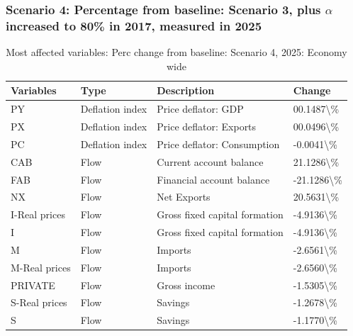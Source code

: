 \documentclass[
]{book}
\begin{document}
\hypertarget{scenario-4-percentage-from-baseline-scenario-3-plus-alpha-increased-to-80-in-2017-measured-in-2025}{%
\subsubsection{\texorpdfstring{Scenario 4: Percentage from baseline: Scenario 3, plus \(\alpha\) increased to 80\% in 2017, measured in 2025}{Scenario 4: Percentage from baseline: Scenario 3, plus \textbackslash alpha increased to 80\% in 2017, measured in 2025}}\label{scenario-4-percentage-from-baseline-scenario-3-plus-alpha-increased-to-80-in-2017-measured-in-2025}}

\begin{table}

\caption{\label{tab:most-affected-Scenario-4-2025-perc-economy}Most affected variables: Perc change from baseline: Scenario 4, 2025: Economy wide}
\centering
\fontsize{10}{12}\selectfont
\begin{tabular}[t]{l|l|l|l}
\hline
Variables & Type & Description & Change\\
\hline
PY & Deflation index & Price deflator: GDP & 00.1487\textbackslash{}\%\\
\hline
PX & Deflation index & Price deflator: Exports & 00.0496\textbackslash{}\%\\
\hline
PC & Deflation index & Price deflator: Consumption & -0.0041\textbackslash{}\%\\
\hline
CAB & Flow & Current account balance & 21.1286\textbackslash{}\%\\
\hline
FAB & Flow & Financial account balance & -21.1286\textbackslash{}\%\\
\hline
NX & Flow & Net Exports & 20.5631\textbackslash{}\%\\
\hline
I-Real prices & Flow & Gross fixed capital formation & -4.9136\textbackslash{}\%\\
\hline
I & Flow & Gross fixed capital formation & -4.9136\textbackslash{}\%\\
\hline
M & Flow & Imports & -2.6561\textbackslash{}\%\\
\hline
M-Real prices & Flow & Imports & -2.6560\textbackslash{}\%\\
\hline
PRIVATE & Flow & Gross income & -1.5305\textbackslash{}\%\\
\hline
S-Real prices & Flow & Savings & -1.2678\textbackslash{}\%\\
\hline
S & Flow & Savings & -1.1770\textbackslash{}\%\\
\hline

\end{tabular}
\end{table}
\end{document}
